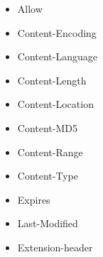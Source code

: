 \documentclass{scrreprt}
\begin{document}
        \begin{itemize}
        \item Allow                   
        \item Content-Encoding     
        \item Content-Language     
        \item Content-Length       
        \item Content-Location     
        \item Content-MD5          
        \item Content-Range        
        \item Content-Type         
        \item Expires              
        \item Last-Modified        
        \item Extension-header
        \end{itemize}
\\
 
\end{document}
